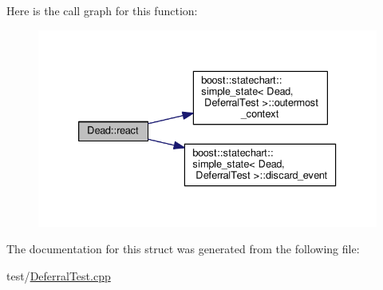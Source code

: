 Here is the call graph for this function\+:
\nopagebreak
\begin{figure}[H]
\begin{center}
\leavevmode
\includegraphics[width=333pt]{struct_dead_a9aa6233af0e887efc1a5b298e4184288_cgraph}
\end{center}
\end{figure}


The documentation for this struct was generated from the following file\+:\begin{DoxyCompactItemize}
\item 
test/\mbox{\hyperlink{_deferral_test_8cpp}{Deferral\+Test.\+cpp}}\end{DoxyCompactItemize}
